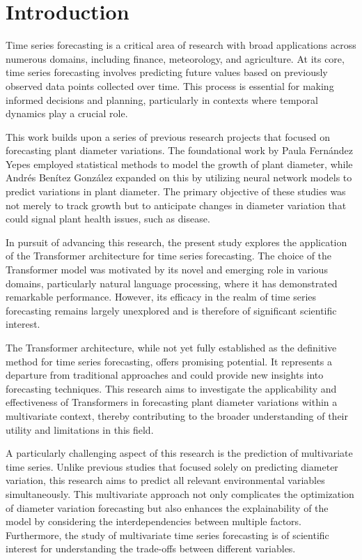 \chapter{Introduction}
\pagestyle{esitscCD}

Time series forecasting is a critical area of research with broad applications across numerous domains, including finance, meteorology, and agriculture. At its core, time series forecasting involves predicting future values based on previously observed data points collected over time. This process is essential for making informed decisions and planning, particularly in contexts where temporal dynamics play a crucial role.

This work builds upon a series of previous research projects that focused on forecasting plant diameter variations. The foundational work by Paula Fernández Yepes\cite{FernandezYepes2022} employed statistical methods to model the growth of plant diameter, while Andrés Benítez González\cite{BenitezGonzalez2023} expanded on this by utilizing neural network models to predict variations in plant diameter. The primary objective of these studies was not merely to track growth but to anticipate changes in diameter variation that could signal plant health issues, such as disease.

In pursuit of advancing this research, the present study explores the application of the Transformer architecture for time series forecasting. The choice of the Transformer model was motivated by its novel and emerging role in various domains, particularly natural language processing, where it has demonstrated remarkable performance. However, its efficacy in the realm of time series forecasting remains largely unexplored and is therefore of significant scientific interest.

The Transformer architecture, while not yet fully established as the definitive method for time series forecasting, offers promising potential. It represents a departure from traditional approaches and could provide new insights into forecasting techniques. This research aims to investigate the applicability and effectiveness of Transformers in forecasting plant diameter variations within a multivariate context, thereby contributing to the broader understanding of their utility and limitations in this field.

A particularly challenging aspect of this research is the prediction of multivariate time series. Unlike previous studies that focused solely on predicting diameter variation, this research aims to predict all relevant environmental variables simultaneously. This multivariate approach not only complicates the optimization of diameter variation forecasting but also enhances the explainability of the model by considering the interdependencies between multiple factors. Furthermore, the study of multivariate time series forecasting is of scientific interest for understanding the trade-offs between different variables.

